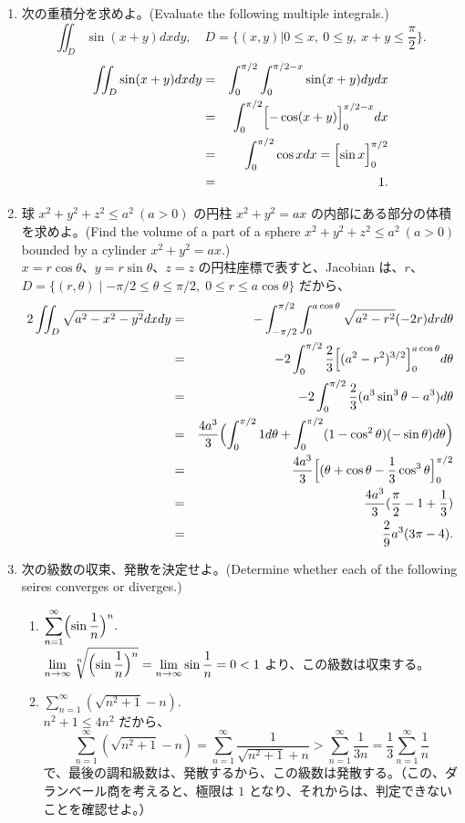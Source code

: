 \begin{enumerate}
\item 次の重積分を求めよ。(Evaluate the following multiple integrals.)
$$\iint_D \sin(x+y)dxdy, \quad 
D = \{(x,y)| 0\leq x, \:0\leq y, \:x+y \leq\frac{\pi}2\}.$$
\sol
\begin{eqnarray*}
\iint_D \sin(x+y)dxdy & = & \int_0^{\pi/2}\int_0^{\pi/2-x}\sin(x+y)dydx\\
& = & \int_0^{\pi/2}\Bigl[-\cos(x+y)\Bigr]_0^{\pi/2-x}dx\\
& = & \int_0^{\pi/2}\cos xdx = \Bigl[\sin x\Bigr]_0^{\pi/2}\\
& = & 1.
\end{eqnarray*}

\item 球 $x^2 + y^2 + z^2 \leq a^2 \:(a>0)$ の円柱 $x^2 + y^2 = ax$ の内部にある部分の体積を求めよ。(Find the volume of a part of a sphere $x^2 + y^2 + z^2 \leq a^2 \:(a>0)$ bounded by a cylinder $x^2 + y^2 = ax$.)\\
\sol
$x = r\cos\theta$、$y = r\sin\theta$、$z = z$ の円柱座標で表すと、Jacobian は、$r$、
$D = \{(r,\theta)\mid -\pi/2\leq \theta \leq \pi/2, \;0\leq r\leq a\cos\theta\}$ だから、
\begin{eqnarray*}
2\iint_D\sqrt{a^2 - x^2 - y^2}dxdy & = & -\int_{-\pi/2}^{\pi/2}\int_0^{a\cos\theta}\sqrt{a^2 - r^2}(-2r)drd\theta\\
& = & -2\int_0^{\pi/2}\frac{2}{3}\Bigl[(a^2 - r^2)^{3/2}\Bigr]_0^{a\cos\theta}d\theta\\
& = & -2\int_0^{\pi/2}\frac{2}{3}(a^3\sin^3\theta - a^3)d\theta\\
& = & \frac{4a^3}{3}\Bigl(\int_0^{\pi/2}1d\theta + \int_0^{\pi/2}(1-\cos^2\theta)(-\sin\theta)d\theta\Bigr)\\
& = & \frac{4a^3}{3}\Bigl[(\theta + \cos\theta-\frac13\cos^3\theta\Bigr]_0^{\pi/2}\\
& = & \frac{4a^3}{3}(\frac{\pi}{2} - 1 + \frac13)\\
& = & \frac29a^3(3\pi-4).
\end{eqnarray*}

\item 次の級数の収束、発散を決定せよ。(Determine whether each of the following seires converges or diverges.)
     \begin{enumerate}
     \item $\displaystyle{\sum_{n=1}^{\infty}\Bigl(\sin\frac1n\Bigr)^n}.$\\
     \sol 
     ${\displaystyle \lim_{n\to\infty}\root{n}\of{\Bigl(\sin\frac1n\Bigr)^n} = 
     \lim_{n\to\infty}\sin\frac1n = 0 < 1}$ より、この級数は収束する。
     \item $\displaystyle{\sum_{n=1}^{\infty}(\sqrt{n^2 + 1} - n)}.$\\
     \sol
     $n^2 + 1 \leq 4n^2$ だから、
     $$\sum_{n=1}^{\infty}(\sqrt{n^2 + 1} - n) = \sum_{n=1}^{\infty}\frac{1}{\sqrt{n^2 + 1} +n} >  \sum_{n=1}^{\infty}\frac{1}{3n} = \frac13 \sum_{n=1}^{\infty}\frac{1}{n}$$
     で、最後の調和級数は、発散するから、この級数は発散する。（この、ダランベール商を考えると、極限は $1$ となり、それからは、判定できないことを確認せよ。）
     \end{enumerate}


\end{enumerate}
